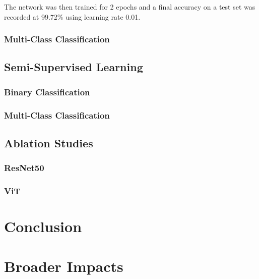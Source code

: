 \documentclass{article}
\begin{document}
  The network was then trained for 2 epochs and a final accuracy on a test set was recorded at 99.72\% using learning rate 0.01. 


\subsubsection{Multi-Class Classification}


\subsection{Semi-Supervised Learning}

\subsubsection{Binary Classification}

\subsubsection{Multi-Class Classification}



\subsection{Ablation Studies}
\subsubsection{ResNet50}

\subsubsection{ViT}

\section{Conclusion}


\section{Broader Impacts}
\end{document}
